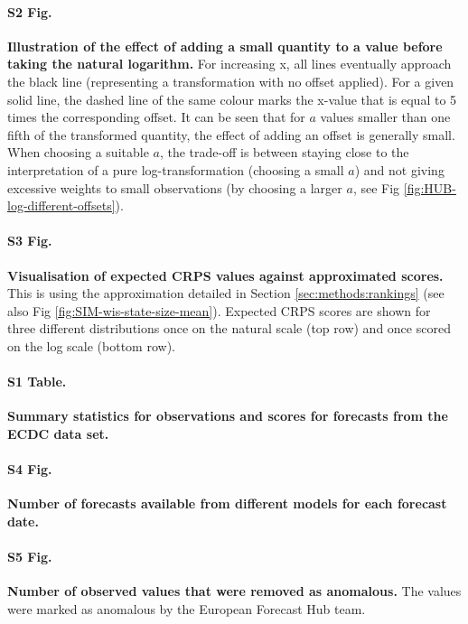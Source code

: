 \documentclass[10pt,letterpaper]{article}
\begin{document}
\paragraph{S2 Fig.}
\label{fig:illustration-effect-log-offset}
\textbf{Illustration of the effect of adding a small quantity to a value before taking the natural logarithm. }
For increasing x, all lines eventually approach the black line (representing a transformation with no offset applied).
    For a given solid line, the dashed line of the same colour marks the x-value that  is equal to 5 times the corresponding offset. It can be seen that for $a$ values smaller than one fifth of the transformed quantity, the effect of adding an offset is generally small. When choosing a suitable $a$, the trade-off is between staying close to the interpretation of a pure log-transformation (choosing a small $a$) and not giving excessive weights to small observations (by choosing a larger $a$, see Fig \ref{fig:HUB-log-different-offsets}).
    
\paragraph{S3 Fig.}
\label{fig:score-approx}
\textbf{Visualisation of expected CRPS values against approximated scores.} 
This is using the approximation detailed in Section \ref{sec:methods:rankings} (see also Fig \ref{fig:SIM-wis-state-size-mean}). Expected CRPS scores are shown for three different distributions once on the natural scale (top row) and once scored on the log scale (bottom row). 

\paragraph{S1 Table.}
\label{tab:HUB-summary}
\textbf{Summary statistics for observations and scores for forecasts from the ECDC data set.}

\paragraph{S4 Fig.}
\label{fig:HUB-num-avail-models}
\textbf{Number of forecasts available from different models for each forecast date.}
    
\paragraph{S5 Fig.}
\label{fig:number-anomalies}
\textbf{Number of observed values that were removed as anomalous. }
The values were marked as anomalous by the European Forecast Hub team. 
    
\end{document}
